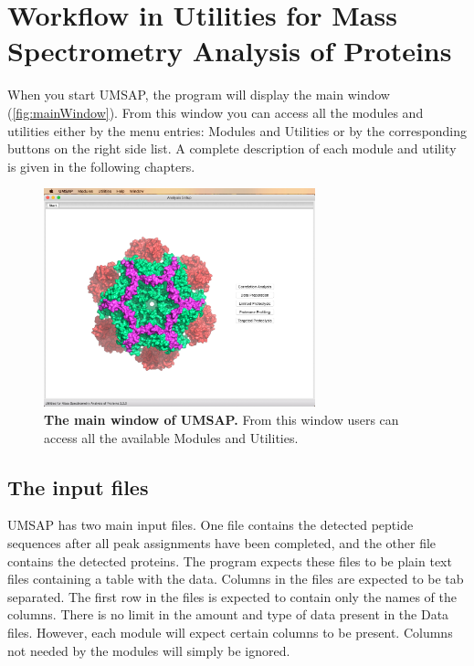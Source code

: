 \chapter{Workflow in Utilities for Mass Spectrometry Analysis of Proteins}
\label{chap:workflow}

When you start UMSAP, the program will display the main window (\autoref{fig:mainWindow}).
From this window you can access all the modules and utilities either by the menu
entries: Modules and Utilities or by the corresponding buttons on the right side
list. A complete description of each module and utility is given in the following
chapters.

\begin{figure}[h]
    \centering
    \includegraphics[width=0.7\textwidth]{./IMAGES/MAIN-WINDOW/mainwindow.jpg}
    \caption[The main window of UMSAP]{\textbf{The main window of UMSAP.} From
this window users can access all the available Modules and Utilities.} 
    \label{fig:mainWindow}
    \vspace{-5pt}
\end{figure}  

\section{The input files}
\label{sec:dataFile}

UMSAP has two main input files. One file contains the detected peptide sequences
after all peak assignments have been completed, and the other file contains the
detected proteins. The program expects these files to be plain text files containing
a table with the data. Columns in the files are expected to be tab separated. The
first row in the files is expected to contain only the names of the columns. There
is no limit in the amount and type of data present in the Data files. However, each
module will expect certain columns to be present. Columns not needed by the modules
will simply be ignored.

